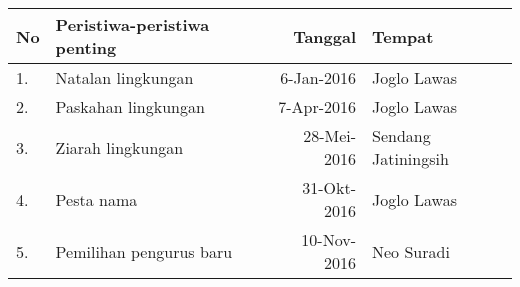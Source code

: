 \begin{table}[h!]
\centering
\begin{tabular}{|l|l|r|l|}
	\hline
	\textbf{No}&\textbf{Peristiwa-peristiwa penting}&\textbf{Tanggal}&\textbf{Tempat}\\ \hline
	1.&Natalan lingkungan & 6-Jan-2016 & Joglo Lawas\\ \hline
	2.&Paskahan lingkungan & 7-Apr-2016 & Joglo Lawas\\ \hline
	3.&Ziarah lingkungan & 28-Mei-2016 & Sendang Jatiningsih \\ \hline
	4.&Pesta nama & 31-Okt-2016 & Joglo Lawas \\ \hline 
	5.&Pemilihan pengurus baru& 10-Nov-2016 & Neo Suradi\\ \hline
\end{tabular}
\end{table}
